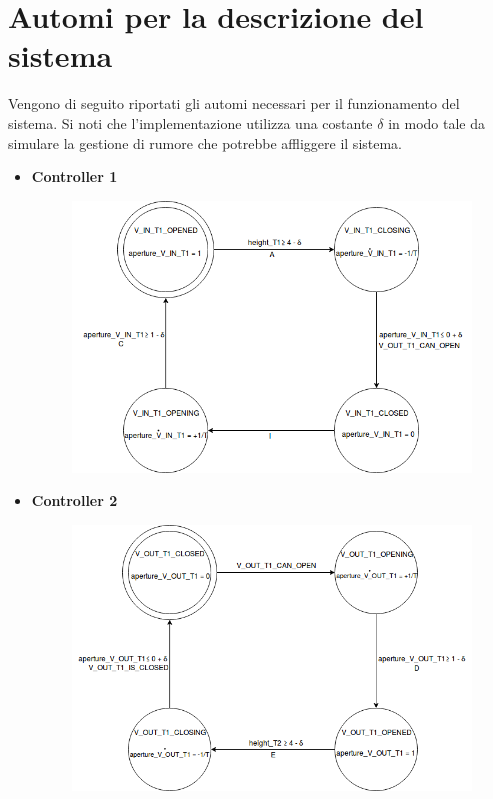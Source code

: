 \documentclass[12pt]{article}
\begin{document}
\section{Automi per la descrizione del sistema}
Vengono di seguito riportati gli automi necessari per il funzionamento del sistema. Si noti che l'implementazione utilizza una costante $\delta$ in modo tale da simulare la gestione di rumore che potrebbe affliggere il sistema.
\begin{itemize}
	\item \textbf{Controller 1}
	\begin{figure}[H]
	\begin{center}
	\includegraphics[width=1\textwidth]{images/controller1.png}
	\end{center}
	\end{figure}
	
	\newpage
	\item \textbf{Controller 2}
	\begin{figure}[H]
	\begin{center}
	\includegraphics[width=1\textwidth]{images/controller2.png}
	\end{center}
	\end{figure}
	

\end{itemize}
\end{document}

